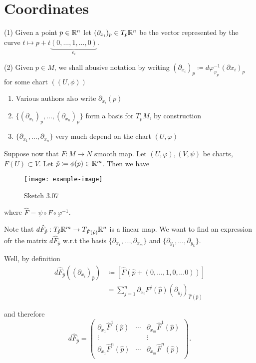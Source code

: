 \section{Coordinates}

\begin{definition}
    (1) Given a point \(p\in\mathbb{R}^n\) let \((\partial_{x_i})_p\in T_p\mathbb{R}^n\) be the vector represented by 
    the curve \(t\mapsto p+t\underbrace{(0,\dots,1,\dots,0)}_{e_i}\).

    (2) Given \(p\in M\), we shall abusive notation by writing \((\partial_{x_i})_p\coloneqq d\varphi_{\varphi_p}^{-1}(\partial x_i)_p\) for some chart \(((U,\phi))\) 
\end{definition}

\begin{remark}
    \begin{enumerate}
        \item Various authors also write \(\partial_{x_i}(p)\)
        \item  \(\{(\partial_{x_1})_p,\dots,(\partial_{x_n})_p\}\) form a basis for \(T_pM\), by construction
        \item \(\{\partial_{x_1},\dots,\partial_{x_n}\}\) very much depend on the chart \((U,\varphi)\)
    \end{enumerate}
\end{remark}

Suppose now that \(F:M\to N\) smooth map. Let \((U,\varphi),(V,\psi)\) be charts, \(F(U)\subset V\). Let 
\(\hat{p}\coloneqq \phi(p)\in\mathbb{R}^m\). Then we have 
\begin{figure}[H]
    \centering
    \texttt{[image: example-image]}
    \caption{Sketch 3.07}
\end{figure}
where \(\hat{F}=\psi\circ F\circ \varphi^{-1}\).

Note that \(d\hat{F}_{\hat{p}}:T_{\hat{p}}\mathbb{R}^m\to T_{\hat{F}(\hat{p})}\mathbb{R}^n\) is a linear map. We want to find 
an expression ofr the matrix  \(d\hat{F}_{\hat{p}}\) w.r.t the basis \(\{\partial_{x_1},\dots,\partial_{x_m}\}\) and \(\{\partial_{y_1},\dots,\partial_{y_k}\}\).

Well, by definition
\begin{align*}
    d\hat{F}_{\hat{p}}((\partial_{x_i})_{\hat{p}})&\coloneqq [\hat{F}(\hat{p}+(0,\dots,1,0,\dots 0))]\\
    &=\sum_{j=1}^n \partial_{{x_i}} F^j(\hat{p})(\partial_{y_j})_{\hat{F}(\hat{p})}
\end{align*}

and therefore 
\[d\hat{F}_{\hat{p}}=\begin{pmatrix}
    \partial_{x_1} \hat{F}^1(\hat{p}) & \cdots &\partial_{x_m} \hat{F}^1(\hat{p})\\
    \vdots & & \vdots \\
    \partial_{x_1} \hat{F}^n(\hat{p}) & \cdots &\partial_{x_m} \hat{F}^n(\hat{p})\\
\end{pmatrix}.\]



